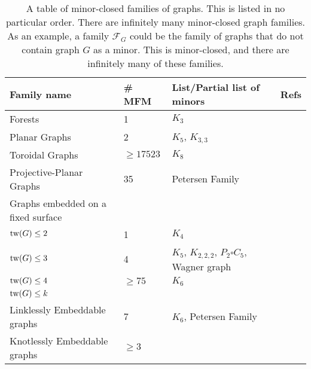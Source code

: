 \begin{table}[h!]
    
    \centering
    \begin{tabular}{@{}llll@{}}
    \toprule
    Family name                  & \# MFM & List/Partial list of minors                      & Refs \\ \midrule
    Forests                      & 1                                  & $K_3$                                            &            \\
    Planar Graphs                & 2                                  & $K_5$, $K_{3,3}$                                 & \tablefootnote{\textcite{wagnerUeberEigenschaftEbenen1937}}           \\
    Toroidal Graphs              & $\geq 17523$                       & $K_8$                                            & \tablefootnote{\textcite{myrvoldLargeSetTorus2018}}           \\
    Projective-Planar Graphs     & 35                                 & Petersen Family                                  & \tablefootnote{\textcite{moharGraphsSurfaces2001}}           \\
    Graphs embedded on a fixed surface & & &\\
    $\operatorname{tw}(G) \leq 2$              & 1                                  & $K_4$                                            &            \\
    $\operatorname{tw}(G) \leq 3$              & 4                                  & $K_5$, $K_{2,2,2}$, $P_2 \square C_5$, Wagner graph & \tablefootnote{\textcite{arnborgForbiddenMinorsCharacterization1990}}           \\
    $\operatorname{tw}(G) \leq 4$              & $\geq 75$                          & $K_6$                                            & \tablefootnote{\textcite{sandersLinearAlgorithmsGraphs1993}}           \\
    $\operatorname{tw}(G) \leq k$              &                                    &                                                  &            \\
    Linklessly Embeddable graphs & 7                                  & $K_6$, Petersen Family                           & \tablefootnote{\textcite{conwayKnotsLinksSpatial1983}} \\
    Knotlessly Embeddable graphs & $\geq 3$                           &                                                  & \tablefootnote{\textcite{conwayKnotsLinksSpatial1983,foisyIntrinsicallyKnottedGraphs2002,foisyIntrinsicallyKnottedGraphs2002}}          
    \end{tabular}
    \caption[Table of Minor-Closed Families of graphs]{A table of minor-closed families of graphs. This is listed in no particular order. There are infinitely many minor-closed graph families. As an example, a family $\mathcal{F}_G$ could be the family of graphs that do not contain graph $G$ as a minor. This is minor-closed, and there are infinitely many of these families.}\label{tab:minor-closed families}
    \end{table}
